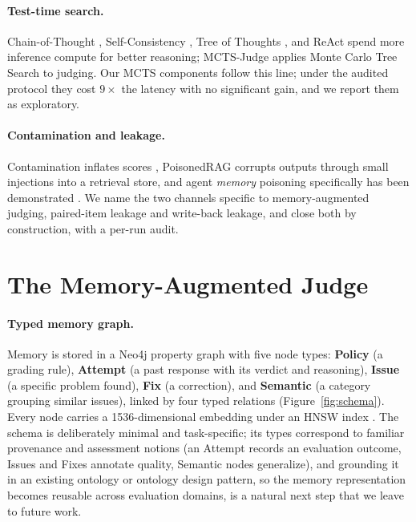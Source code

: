 \documentclass[]{ceurart}
\begin{document}
\paragraph{Test-time search.} Chain-of-Thought \citep{chain_of_thought2022}, Self-Consistency \citep{self_consistency2023}, Tree of Thoughts \citep{tree_of_thoughts2023}, and ReAct \citep{react2023} spend more inference compute for better reasoning; MCTS-Judge \citep{mcts_judge2025} applies Monte Carlo Tree Search \citep{uct2006, mcts_survey2012} to judging. Our MCTS components follow this line; under the audited protocol they cost $9\times$ the latency with no significant gain, and we report them as exploratory.

\paragraph{Contamination and leakage.} Contamination inflates scores \citep{data_contamination2024, benchmark_contamination2024, eval_leakage2024}, PoisonedRAG \citep{rag_poisoning2024} corrupts outputs through small injections into a retrieval store, and agent \emph{memory} poisoning specifically has been demonstrated \citep{chen2024agentpoison, dong2025minja}. We name the two channels specific to memory-augmented judging, paired-item leakage and write-back leakage, and close both by construction, with a per-run audit.

\section{The Memory-Augmented Judge}
\label{sec:system}

\paragraph{Typed memory graph.} Memory is stored in a Neo4j property graph \citep{neo4j2023} with five node types: \textbf{Policy} (a grading rule), \textbf{Attempt} (a past response with its verdict and reasoning), \textbf{Issue} (a specific problem found), \textbf{Fix} (a correction), and \textbf{Semantic} (a category grouping similar issues), linked by four typed relations (Figure~\ref{fig:schema}). Every node carries a 1536-dimensional embedding \citep{openai_embeddings2024} under an HNSW index \citep{hnsw2018}. The schema is deliberately minimal and task-specific; its types correspond to familiar provenance and assessment notions (an Attempt records an evaluation outcome, Issues and Fixes annotate quality, Semantic nodes generalize), and grounding it in an existing ontology or ontology design pattern, so the memory representation becomes reusable across evaluation domains, is a natural next step that we leave to future work.
\end{document}

